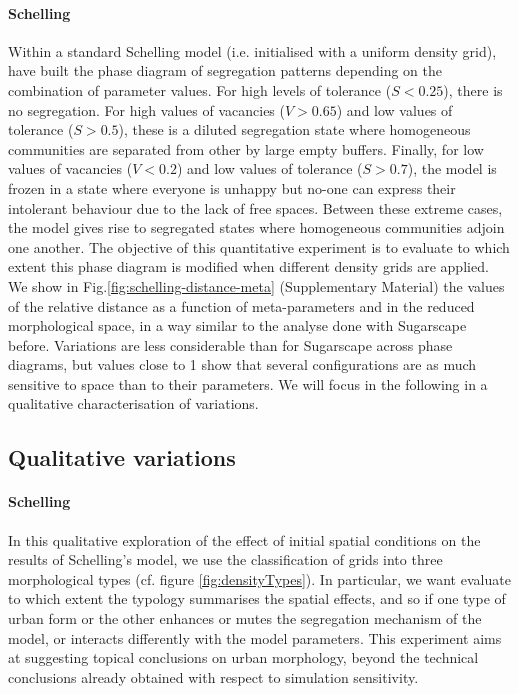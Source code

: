 \documentclass[3p,times,procedia]{elsarticle}
\begin{document}
\paragraph{Schelling} 
Within a standard Schelling model (i.e. initialised with a uniform density grid), \citet{Gauvinetal2009} have built the phase diagram of segregation patterns depending on the combination of parameter values. For high levels of tolerance ($S < 0.25$), there is no segregation. For high values of vacancies ($V > 0.65$) and low values of tolerance ($S > 0.5$), these is a diluted segregation state where homogeneous communities are separated from other by large empty buffers. Finally, for low values of vacancies ($V < 0.2$) and low values of tolerance ($S > 0.7$), the model is frozen in a state where everyone is unhappy but no-one can express their intolerant behaviour due to the lack of free spaces. Between these extreme cases, the model gives rise to segregated states where homogeneous communities adjoin one another. The objective of this quantitative experiment is to evaluate to which extent this phase diagram is modified when different density grids are applied. We show in Fig.\ref{fig:schelling-distance-meta} (Supplementary Material) the values of the relative distance as a function of meta-parameters and in the reduced morphological space, in a way similar to the analyse done with Sugarscape before. Variations are less considerable than for Sugarscape across phase diagrams, but values close to 1 show that several configurations are as much sensitive to space than to their parameters. We will focus in the following in a qualitative characterisation of variations.

\subsection{Qualitative variations}

\paragraph{Schelling} In this qualitative exploration of the effect of initial spatial conditions on the results of Schelling's model, we use the classification of grids into three morphological types (cf. figure \ref{fig:densityTypes}). In particular, we want evaluate to which extent the typology summarises the spatial effects, and so if one type of urban form or the other enhances or mutes the segregation mechanism of the model, or interacts differently with the model parameters. This experiment aims at suggesting topical conclusions on urban morphology, beyond the technical conclusions already obtained with respect to simulation sensitivity.
\end{document}
